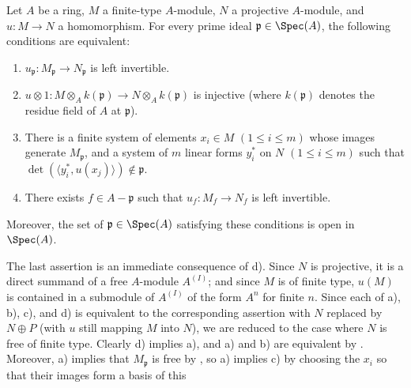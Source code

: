 \begin{corollary}[19.1.12]
\label{0.19.1.12}
Let $A$ be a ring, $M$ a finite-type $A$-module, $N$ a projective $A$-module, and $u:M\to N$ a homomorphism.
For every prime ideal $\mathfrak p\in\Spec(A)$, the following conditions are equivalent:
\begin{enumerate}
  \item[a)] $u_{\mathfrak p}:M_{\mathfrak p}\to N_{\mathfrak p}$ is left invertible.
  \item[b)] $u\otimes1:M\otimes_Ak(\mathfrak p)\to N\otimes_Ak(\mathfrak p)$ is injective (where $k(\mathfrak p)$ denotes the residue field of $A$ at $\mathfrak p$).
  \item[c)] There is a finite system of elements $x_i\in M$ $(1\leq i\leq m)$ whose images generate $M_{\mathfrak p}$, and a system of $m$ linear forms $y_i^*$ on $N$ $(1\leq i\leq m)$ such that $\det(\langle y_i^*,u(x_j)\rangle)\notin\mathfrak p$.
  \item[d)] There exists $f\in A-\mathfrak p$ such that $u_f:M_f\to N_f$ is left invertible.
\end{enumerate}
Moreover, the set of $\mathfrak p\in\Spec(A)$ satisfying these conditions is open in $\Spec(A)$.
\end{corollary}

The last assertion is an immediate consequence of d).
Since $N$ is projective, it is a direct summand of a free $A$-module $A^{(I)}$;
and since $M$ is of finite type, $u(M)$ is contained in a submodule of $A^{(I)}$ of the form $A^n$ for finite $n$.
Since each of a), b), c), and d) is equivalent to the corresponding assertion with $N$ replaced by $N\oplus P$ (with $u$ still mapping $M$ into $N$), we are reduced to the case where $N$ is free of finite type.
Clearly d) implies a), and a) and b) are equivalent by .
Moreover, a) implies that $M_{\mathfrak p}$ is free by , so a) implies c) by choosing the $x_i$ so that their images form a basis of this


